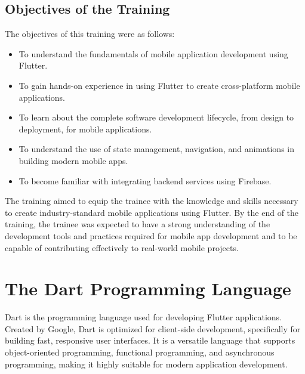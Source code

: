 \documentclass[12pt,a4paper]{report}
\begin{document}
\subsection{Objectives of the Training}
The objectives of this training were as follows:
\begin{itemize}
    \item To understand the fundamentals of mobile application development using Flutter.
    \item To gain hands-on experience in using Flutter to create cross-platform mobile applications.
    \item To learn about the complete software development lifecycle, from design to deployment, for mobile applications.
    \item To understand the use of state management, navigation, and animations in building modern mobile apps.
    \item To become familiar with integrating backend services using Firebase.
\end{itemize}

The training aimed to equip the trainee with the knowledge and skills necessary to create industry-standard mobile applications using Flutter. By the end of the training, the trainee was expected to have a strong understanding of the development tools and practices required for mobile app development and to be capable of contributing effectively to real-world mobile projects.

\section{The Dart Programming Language}
Dart is the programming language used for developing Flutter applications. Created by Google, Dart is optimized for client-side development, specifically for building fast, responsive user interfaces. It is a versatile language that supports object-oriented programming, functional programming, and asynchronous programming, making it highly suitable for modern application development.
\end{document}
